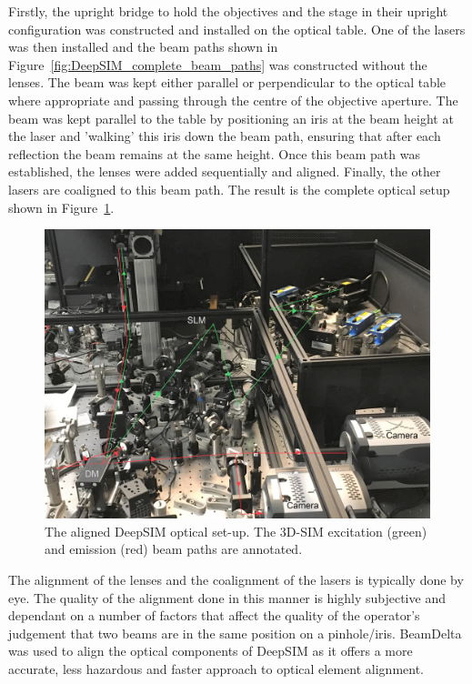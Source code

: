 Firstly, the upright bridge to hold the objectives and the stage in their upright configuration was constructed and installed on the optical table. One of the lasers was then installed and the beam paths shown in Figure~\ref{fig:DeepSIM_complete_beam_paths} was constructed without the lenses. The beam was kept either parallel or perpendicular to the optical table where appropriate and passing through the centre of the objective aperture. The beam was kept parallel to the table by positioning an iris at the beam height at the laser and 'walking' this iris down the beam path, ensuring that after each reflection the beam remains at the same height. Once this beam path was established, the lenses were added sequentially and aligned. Finally, the other lasers are coaligned to this beam path. The result is the complete optical setup shown in Figure~\ref{fig:DeepSIM_physical_optics}.

\begin{figure}[h]
	\centering
	\includegraphics[width=\textwidth]{images/DeepSIM_SIM_path_annotated_bright.jpg}
	\caption[The aligned DeepSIM optical set-up.]{The aligned DeepSIM optical set-up. The 3D-SIM excitation (green) and emission (red) beam paths are annotated.}
	\label{fig:DeepSIM_physical_optics}
\end{figure}

The alignment of the lenses and the coalignment of the lasers is typically done by eye. The quality of the alignment done in this manner is highly subjective and dependant on a number of factors that affect the quality of the operator’s judgement that two beams are in the same position on a pinhole/iris. BeamDelta was used to align the optical components of DeepSIM as it offers a more accurate, less hazardous and faster approach to optical element alignment\cite{dobbie2019beamdelta}.

